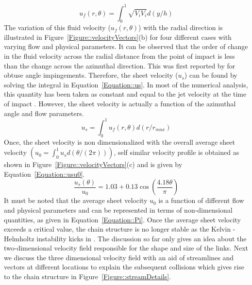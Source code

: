 \documentclass[%
aip,
sd,%
amsmath,amssymb,
preprint,%
author-year,%
]{revtex4-1}
\begin{document}
\begin{equation}\label{Equation::uf}
u_f(r,\theta) = \int_{0}^{1}\sqrt{V_iV_i}d(y/h)
\end{equation}
The variation of this fluid velocity ($u_f(r,\theta)$) with the radial direction is illustrated in Figure~\ref{Figure::velocityVectors}(b) for four different cases with varying flow and physical parameters. It can be observed that the order of change in the fluid velocity across the radial distance from the point of impact is less than the change across the azimuthal direction. This was first reported by \cite{choo2002velocity} for obtuse angle impingements. Therefore, the sheet velocity ($u_s$) can be found by solving the integral in Equation~\ref{Equation::us}. In most of the numerical analysis, this quantity has been taken as constant and equal to the jet velocity at the time of impact \citep{bush2004collision,bremond2006atomization,hasson1964thickness}. However, the sheet velocity is actually a function of the azimuthal angle and flow parameters. 
\begin{equation}\label{Equation::us}
u_s = \int_{0}^{1}u_f(r,\theta)d(r/r_{max})
\end{equation}   
Once, the sheet velocity is non dimensionalized with the overall average sheet velocity $\left(u_0 = \int_{0}^{1}u_sd(\theta/(2\pi))\right)$, self similar velocity profile is obtained as shown in Figure~\ref{Figure::velocityVectors}(c) and is given by Equation~\ref{Equation::usu0}.
\begin{equation}\label{Equation::usu0}
\frac{u_s(\theta)}{u_0} = 1.03 + 0.13\cos\left(\frac{4.18\theta}{\pi}\right)
\end{equation}
It must be noted that the average sheet velocity $u_0$ is a function of different flow and physical parameters and can be represented in terms of non-dimensional quantities, as given in Equation~\ref{Equation::Pi}. Once the average sheet velocity exceeds a critical value, the chain structure is no longer stable as the  Kelvin - Helmholtz instability kicks in \citep{villermaux2002life}. The discussion so far only gives an idea about the two-dimensional velocity field responsible for the shape and size of the links. Next we discuss the three dimensional velocity field with an aid of streamlines and vectors at different locations to explain the subsequent collisions which gives rise to the chain structure in Figure~\ref{Figure::streamDetails}.
\end{document}
